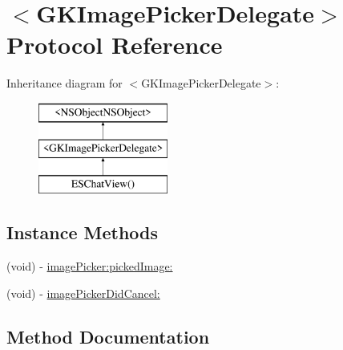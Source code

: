 \hypertarget{protocol_g_k_image_picker_delegate-p}{}\section{$<$G\+K\+Image\+Picker\+Delegate$>$ Protocol Reference}
\label{protocol_g_k_image_picker_delegate-p}
Inheritance diagram for $<$G\+K\+Image\+Picker\+Delegate$>$\+:\begin{figure}[H]
\begin{center}
\leavevmode
\includegraphics[height=3.000000cm]{protocol_g_k_image_picker_delegate-p}
\end{center}
\end{figure}
\subsection*{Instance Methods}
\begin{DoxyCompactItemize}
\item 
(void) -\/ \hyperlink{protocol_g_k_image_picker_delegate-p_acaaa377c0bd9b6487196c48ea4dcb914}{image\+Picker\+:picked\+Image\+:}
\item 
(void) -\/ \hyperlink{protocol_g_k_image_picker_delegate-p_a2fee2a2ffc80dee2aac90e97b38300a0}{image\+Picker\+Did\+Cancel\+:}
\end{DoxyCompactItemize}


\subsection{Method Documentation}
\hypertarget{protocol_g_k_image_picker_delegate-p_acaaa377c0bd9b6487196c48ea4dcb914}{}
